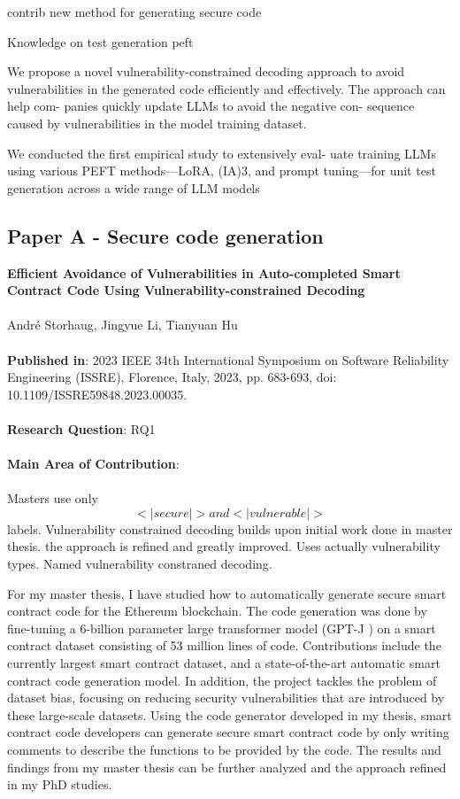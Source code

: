 \documentclass[12pt]{book}
\begin{document}
contrib
new method for generating secure code

Knowledge on test generation peft


We propose a novel vulnerability-constrained decoding approach to avoid vulnerabilities in the generated code efficiently and effectively. The approach can help com- panies quickly update LLMs to avoid the negative con- sequence caused by vulnerabilities in the model training dataset.

We conducted the first empirical study to extensively eval-
uate training LLMs using various PEFT methods—LoRA,
(IA)3, and prompt tuning—for unit test generation across a
wide range of LLM models

\subsection{Paper A - Secure code generation}

\textbf{Efficient Avoidance of Vulnerabilities in Auto-completed Smart Contract Code Using Vulnerability-constrained Decoding}\\\\
\noindent Andr\'e Storhaug, Jingyue Li, Tianyuan Hu\\\\
\noindent \textbf{Published in}: 2023 IEEE 34th International Symposium on Software Reliability Engineering (ISSRE), Florence, Italy, 2023, pp. 683-693, doi: 10.1109/ISSRE59848.2023.00035.\\\\
\noindent \textbf{Research Question}: RQ1\\\\
\noindent \textbf{Main Area of Contribution}: \\\\

Masters use only $$<|secure|> and <|vulnerable|>$$ labels. Vulnerability constrained decoding builds upon initial work done in master thesis. the approach is refined and greatly improved. Uses actually vulnerability types. Named vulnerability constraned decoding.

For my master thesis, I have studied how to automatically generate secure smart contract code for the Ethereum blockchain. The code generation was done by fine-tuning a 6-billion parameter large transformer model (GPT-J \cite{gpt-j}) on a smart contract dataset consisting of 53 million lines of code. Contributions include the currently largest smart contract dataset, and a state-of-the-art automatic smart contract code generation model. In addition, the project tackles the problem of dataset bias, focusing on reducing security vulnerabilities that are introduced by these large-scale datasets. Using the code generator developed in my thesis, smart contract code developers can generate secure smart contract code by only writing comments to describe the functions to be provided by the code. The results and findings from my master thesis can be further analyzed and the approach refined in my PhD studies.
\end{document}
